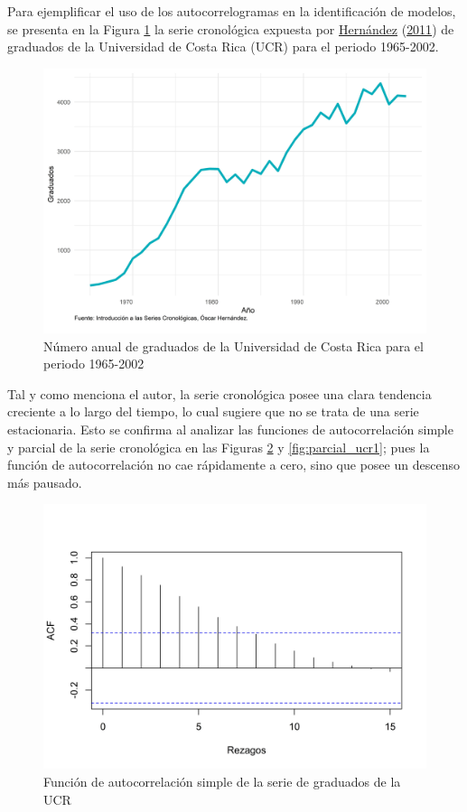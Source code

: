 \documentclass[
]{article}
\begin{document}
Para ejemplificar el uso de los autocorrelogramas en la identificación
de modelos, se presenta en la Figura \ref{fig:ejemplo_ucr} la serie
cronológica expuesta por \protect\hyperlink{ref-oscarh-1}{Hernández}
(\protect\hyperlink{ref-oscarh-1}{2011}) de graduados de la Universidad
de Costa Rica (UCR) para el periodo 1965-2002.

\begin{figure}[H]
\includegraphics[width=1\linewidth,height=1\textheight]{Tesis_files/figure-latex/ejemplo_ucr-1} \caption{Número anual de graduados de la Universidad de Costa Rica para el periodo 1965-2002}\label{fig:ejemplo_ucr}
\end{figure}

Tal y como menciona el autor, la serie cronológica posee una clara
tendencia creciente a lo largo del tiempo, lo cual sugiere que no se
trata de una serie estacionaria. Esto se confirma al analizar las
funciones de autocorrelación simple y parcial de la serie cronológica en
las Figuras \ref{fig:auto_ucr1} y \ref{fig:parcial_ucr1}; pues la
función de autocorrelación no cae rápidamente a cero, sino que posee un
descenso más pausado.

\begin{figure}[H]
\includegraphics[width=1\linewidth,height=1\textheight]{Tesis_files/figure-latex/auto_ucr1-1} \caption{Función de autocorrelación simple de la serie de graduados de la UCR}\label{fig:auto_ucr1}
\end{figure}
\end{document}
